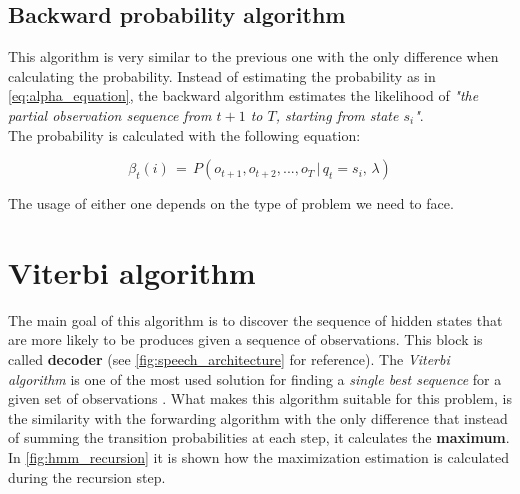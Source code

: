 \subsection{Backward probability algorithm}
This algorithm is very similar to the previous one with the only difference when calculating the probability. Instead of estimating the probability as in \ref{eq:alpha_equation}, the backward algorithm estimates the likelihood of \textit{"the partial observation sequence from $t+1$ to $T$, starting from state $s_{i}$"}\cite{hmm_tutorial}. \\

\noindent The probability is calculated with the following equation:

\begin{equation}
\label{eq:backward_algorithm}
	\beta_{t}(i) \, = \, P(o_{t+1}, o_{t+2}, ... , o_{T} \, | \, q_{t} = s_{i}, \, \lambda)
\end{equation}

\noindent The usage of either one depends on the type of problem we need to face.


\section{Viterbi algorithm}
\label{sec:viterbi}
The main goal of this algorithm is to discover the sequence of hidden states that are more likely to be produces given a sequence of observations. This block is called \textbf{decoder} (see \ref{fig:speech_architecture} for reference). The \textit{Viterbi algorithm} is one of the most used solution for finding a \textit{single best sequence} for a given set of observations \cite{hmm_tutorial}. What makes this algorithm suitable for this problem, is the similarity with the forwarding algorithm with the only difference that instead of summing the transition probabilities at each step, it calculates the \textbf{maximum}. In \ref{fig:hmm_recursion} it is shown how the maximization estimation is calculated during the recursion step.

